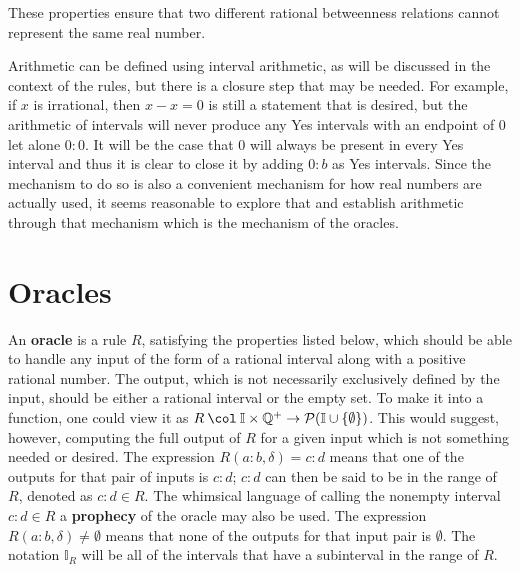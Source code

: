 \documentclass[12pt]{article}
\begin{document}
These properties ensure that two different rational betweenness relations cannot represent the same real number. 

Arithmetic can be defined using interval arithmetic, as will be discussed in the context of the rules, but there is a closure step that may be needed. For example, if $x$ is irrational, then $x - x = 0$ is still a statement that is desired, but the arithmetic of intervals will never produce any Yes intervals with an endpoint of $0$ let alone $0:0$. It will be the case that $0$ will always be present in every Yes interval and thus it is clear to close it by adding $0:b$ as Yes intervals. Since the mechanism to do so is also a convenient mechanism for how real numbers are actually used, it seems reasonable to explore that and establish arithmetic through that mechanism which is the mechanism of the oracles.  

\section{Oracles}

An \textbf{oracle} is a rule $R$, satisfying the properties listed below, which should be able to handle any input of the form of a rational interval along with a positive rational number. The output, which is not necessarily exclusively defined by the input, should be either a rational interval or the empty set. To make it into a function, one could view it as $R \mathbin{\col} \mathbb{I} \times \mathbb{Q}^+ \to \mathcal{P}(\mathbb{I} \cup \{\emptyset\})$. This would suggest, however, computing the full output of $R$ for a given input which is not something needed or desired. The expression $R(a:b, \delta) = c:d$ means that one of the outputs for that pair of inputs is $c:d$; $c:d$ can then be said to be in the range of $R$, denoted as $c:d \in R$. The whimsical language of calling the nonempty interval $c:d \in R$ a \textbf{prophecy} of the oracle may also be used. The expression $R(a:b, \delta) \neq \emptyset$ means that none of the outputs for that input pair is $\emptyset$. The notation $\mathbb{I}_R$ will be all of the intervals that have a subinterval in the range of $R$. 
\end{document}
